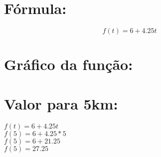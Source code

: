 \documentclass{jhwhw}
\begin{document}
\part{Fórmula:}
\[f(t) = 6 + 4.25t\]
\part{Gráfico da função:}
\begin{center}
\end{center}
\part{Valor para 5km:}
\begin{center}
	\(f(t) = 6 + 4.25t\)\\
	\(f(5) = 6 + 4.25*5\)\\
	\(f(5) = 6 + 21.25\)\\
	\(f(5) = 27.25\)\\
\end{center}
\end{document}

